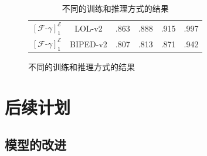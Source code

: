 \documentclass[CJK,aspectratio=169]{beamer}  %
\begin{document}
\begin{frame}
\begin{figure}
\begin{minipage}{0.38\linewidth}
\begin{minipage}{\textwidth}
\begin{table}[!htbp]
{\begin{tabular}{cccccc}
						${\left[\mathcal{F}\text{-}\gamma\right]}^{\mathcal{E}}_1$ & LOL-v2  & .863 & .888 & .915 & .997 \\
						${\left[\mathcal{F}\text{-}\gamma\right]}^{\mathcal{E}}_1$ & BIPED-v2& .807 & .813 & .871 & .942 \\
						\hline
					\end{tabular}
					}
					\captionsetup{font=scriptsize} %
					\caption*{\tiny 不同的训练和推理方式的结果}		
				\end{table}
			\end{minipage}
		\end{minipage}	
		\end{figure}
		\end{frame}
	
	\section{后续计划}
	
	\subsection{模型的改进}
	
\end{document}
